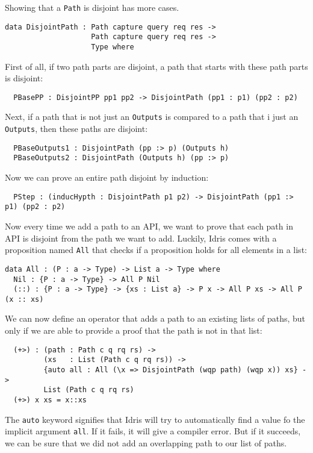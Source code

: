 \documentclass[12pt,a4paper]{article}
\begin{document}
Showing that a \texttt{Path} is disjoint has more cases.
\begin{verbatim}
data DisjointPath : Path capture query req res ->
                    Path capture query req res ->
                    Type where
\end{verbatim}
First of all, if two path parts are disjoint, a path that starts with these path parts is disjoint:
\begin{verbatim}
  PBasePP : DisjointPP pp1 pp2 -> DisjointPath (pp1 : p1) (pp2 : p2)
\end{verbatim}
Next, if a path that is not just an \texttt{Outputs} is compared to a path that i just an \texttt{Outputs}, then these paths are disjoint:
\begin{verbatim}
  PBaseOutputs1 : DisjointPath (pp :> p) (Outputs h)
  PBaseOutputs2 : DisjointPath (Outputs h) (pp :> p)
\end{verbatim}
Now we can prove an entire path disjoint by induction:
\begin{verbatim}
  PStep : (inducHypth : DisjointPath p1 p2) -> DisjointPath (pp1 :> p1) (pp2 : p2)
\end{verbatim}

Now every time we add a path to an API, we want to prove that each path in API is disjoint from the path we want to add. Luckily, Idris comes with a proposition named \texttt{All} that checks if a proposition holds for all elements in a list:
\begin{verbatim}
data All : (P : a -> Type) -> List a -> Type where
  Nil : {P : a -> Type} -> All P Nil
  (::) : {P : a -> Type} -> {xs : List a} -> P x -> All P xs -> All P (x :: xs)
\end{verbatim}

We can now define an operator that adds a path to an existing lists of paths, but only if we are able to provide a proof that the path is not in that list:
\begin{verbatim}
  (+>) : (path : Path c q rq rs) ->
         (xs   : List (Path c q rq rs)) ->
         {auto all : All (\x => DisjointPath (wqp path) (wqp x)) xs} ->
         List (Path c q rq rs)
  (+>) x xs = x::xs
\end{verbatim}
The \texttt{auto} keyword signifies that Idris will try to automatically find a value fo the implicit argument \texttt{all}. If it fails, it will give a compiler error. But if it succeeds, we can be sure that we did not add an overlapping path to our list of paths.
\end{document}
